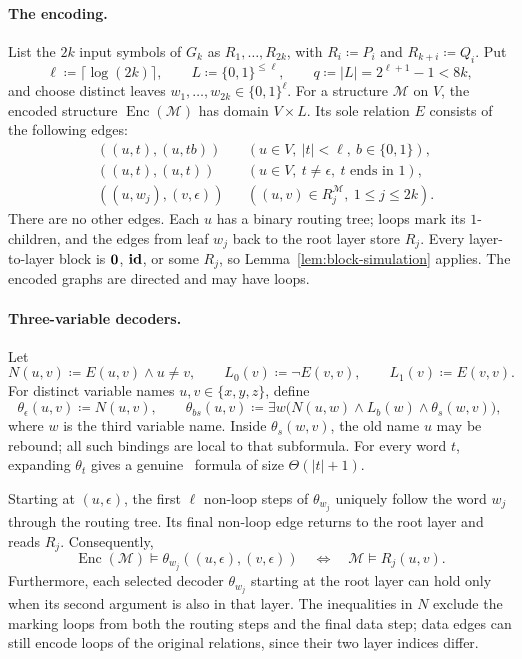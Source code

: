 \paragraph{The encoding.}
List the $2k$ input symbols of $G_k$ as
$R_1,\ldots,R_{2k}$, with $R_i\coloneqq P_i$ and $R_{k+i}\coloneqq Q_i$.
Put
\[
 \ell\coloneqq\lceil\log(2k)\rceil,\qquad
 L\coloneqq\{0,1\}^{\le\ell},\qquad
 q\coloneqq|L|=2^{\ell+1}-1<8k,
\]
and choose distinct leaves $w_1,\ldots,w_{2k}\in\{0,1\}^{\ell}$.
For a structure $\mathcal M$ on $V$, the encoded structure
$\operatorname{Enc}(\mathcal M)$ has domain $V\times L$.
Its sole relation $E$ consists of the following edges:
\[
\begin{aligned}
 &((u,t),(u,tb))
       &&(u\in V,\ |t|<\ell,\ b\in\{0,1\}),\\
 &((u,t),(u,t))
       &&(u\in V,\ t\ne\epsilon,\ t\text{ ends in }1),\\
 &((u,w_j),(v,\epsilon))
       &&((u,v)\in R_j^{\mathcal M},\ 1\le j\le2k).
\end{aligned}
\]
There are no other edges. Each $u$ has a binary routing tree; loops
mark its $1$-children, and the edges from leaf $w_j$ back to the root
layer store $R_j$.
Every layer-to-layer block is $\mathbf{0}$, $\mathbf{id}$, or some $R_j$, so
Lemma~\ref{lem:block-simulation} applies.
The encoded graphs are directed and may have loops.

\paragraph{Three-variable decoders.}
Let
\[
 N(u,v)\coloneqq E(u,v)\land u\ne v,\qquad
 L_0(v)\coloneqq\neg E(v,v),\qquad L_1(v)\coloneqq E(v,v).
\]
For distinct variable names $u,v\in\{x,y,z\}$, define
\[
 \theta_\epsilon(u,v)\coloneqq N(u,v),\qquad
 \theta_{bs}(u,v)\coloneqq
 \exists w\bigl(N(u,w)\land L_b(w)\land\theta_s(w,v)\bigr),
\]
where $w$ is the third variable name.
Inside $\theta_s(w,v)$, the old name $u$ may be rebound; all such
bindings are local to that subformula.
For every word $t$, expanding $\theta_t$ gives a genuine
\FOthree\ formula of size $\Theta(|t|+1)$.

Starting at $(u,\epsilon)$, the first $\ell$ non-loop steps of
$\theta_{w_j}$ uniquely follow the word $w_j$ through the routing tree.
Its final non-loop edge returns to the root layer and reads $R_j$.
Consequently,
\[
 \operatorname{Enc}(\mathcal M)\models
 \theta_{w_j}((u,\epsilon),(v,\epsilon))
 \quad\Longleftrightarrow\quad
 \mathcal M\models R_j(u,v).
\]
Furthermore, each selected decoder $\theta_{w_j}$ starting at the
root layer can hold only when its second argument is also in that layer.
The inequalities in $N$ exclude the marking loops from both the
routing steps and the final data step; data edges can still encode
loops of the original relations, since their two layer indices differ.


